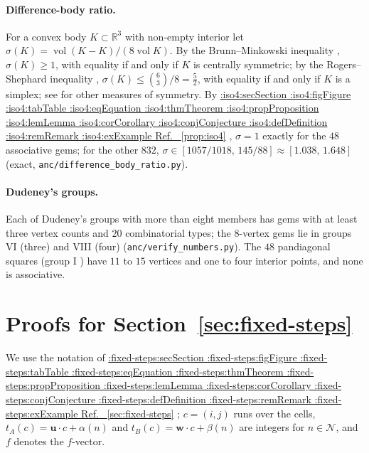 \documentclass[11pt,a4paper]{article}
\makeatletter
\def\Cref@getprefix#1:#2\relax{#1}
\def\Cref@prefix@sec{sec}
\def\Cref@prefix@fig{fig}
\def\Cref@prefix@tab{tab}
\def\Cref@prefix@eq{eq}
\def\Cref@prefix@thm{thm}
\def\Cref@prefix@prop{prop}
\def\Cref@prefix@lem{lem}
\def\Cref@prefix@cor{cor}
\def\Cref@prefix@conj{conj}
\def\Cref@prefix@def{def}
\def\Cref@prefix@rem{rem}
\def\Cref@prefix@ex{ex}
\def\Cref@type@cap#1{%
  \edef\Cref@tmp{#1}%
  \ifx\Cref@tmp\Cref@prefix@sec Section%
  \else\ifx\Cref@tmp\Cref@prefix@fig Figure%
  \else\ifx\Cref@tmp\Cref@prefix@tab Table%
  \else\ifx\Cref@tmp\Cref@prefix@eq Equation%
  \else\ifx\Cref@tmp\Cref@prefix@thm Theorem%
  \else\ifx\Cref@tmp\Cref@prefix@prop Proposition%
  \else\ifx\Cref@tmp\Cref@prefix@lem Lemma%
  \else\ifx\Cref@tmp\Cref@prefix@cor Corollary%
  \else\ifx\Cref@tmp\Cref@prefix@conj Conjecture%
  \else\ifx\Cref@tmp\Cref@prefix@def Definition%
  \else\ifx\Cref@tmp\Cref@prefix@rem Remark%
  \else\ifx\Cref@tmp\Cref@prefix@ex Example%
  \else Ref.%
  \fi\fi\fi\fi\fi\fi\fi\fi\fi\fi\fi\fi
}
\DeclareRobustCommand{\Cref}[1]{%
  \begingroup
  \edef\Cref@label{#1}%
  \edef\Cref@prefix{\expandafter\Cref@getprefix\Cref@label:\relax}%
  \hyperref[#1]{\Cref@type@cap{\Cref@prefix}~\ref*{#1}}%
  \endgroup
}
\theoremstyle{plain}
\theoremstyle{definition}
\theoremstyle{remark}
\newcommand{\R}{\mathbb{R}}
\makeatother
\begin{document}
\paragraph{Difference-body ratio.}
For a convex body $K\subset\R^3$ with non-empty interior let $\sigma(K)=\operatorname{vol}(K-K)/(8\operatorname{vol}K)$. By the Brunn--Minkowski inequality \cite{schneider2014convex}, $\sigma(K)\ge1$, with equality if and only if $K$ is centrally symmetric; by the Rogers--Shephard inequality \cite{rogers1957difference}, $\sigma(K)\le\binom63/8=\frac52$, with equality if and only if $K$ is a simplex; see \cite{grunbaum1963measures,schneider2014convex} for other measures of symmetry.
By \Cref{prop:iso4}, $\sigma=1$ exactly for the $48$ associative gems; for the other $832$, $\sigma\in[1057/1018,\,145/88]\approx[1.038,\,1.648]$ (exact, \texttt{anc/difference\_body\_ratio.py}).

\paragraph{Dudeney's groups.}
Each of Dudeney's groups with more than eight members has gems with at least three vertex counts and $20$ combinatorial types; the $8$-vertex gems lie in groups VI (three) and VIII (four) (\texttt{anc/verify\_numbers.py}).
The $48$ pandiagonal squares (group I \cite{ollerenshaw1998most}) have $11$ to $15$ vertices and one to four interior points, and none is associative.

\section{Proofs for Section~\ref{sec:fixed-steps}}
\label{sec:app-fixed-steps}

We use the notation of \Cref{sec:fixed-steps}; $c=(i,j)$ runs over the cells, $t_A(c)=\mathbf u\cdot c+\alpha(n)$ and $t_B(c)=\mathbf w\cdot c+\beta(n)$ are integers for $n\in\mathcal N$, and $f$ denotes the $f$-vector.
\end{document}
